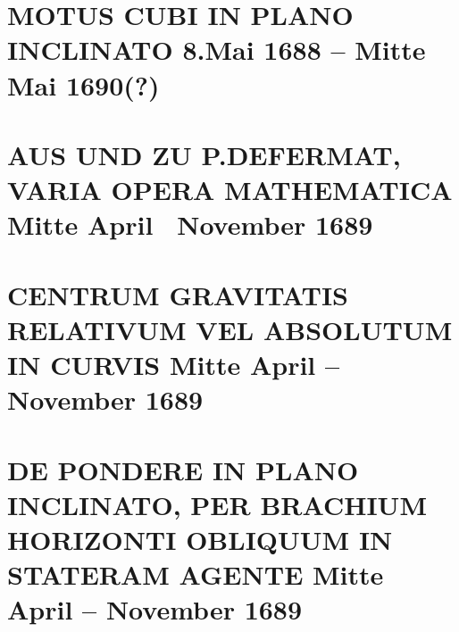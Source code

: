 \documentclass[%
fontsize=10pt,
]{scrbook}
\DeclareRobustCommand{\bracks}[1]{%
\textup{\lbrack}#1\textup{\rbrack}}
\begin{document}
\label{41199}






\chapter[tocentry={Motus cubi in plano inclinato
\enskip\bracks{8.\;Mai 1688 -- Mitte Mai 1690\;(?)}},
head={Motus cubi in plano inclinato}]%
{\MakeUppercase{Motus cubi in plano inclinato}
\newline\bracks{8.\;Mai 1688 -- Mitte Mai 1690\;(?)}}
\label{60118}






\chapter[tocentry={Aus und zu P.\;de\;Fermat, Varia opera mathematica
\enskip \bracks{Mitte April \textendash\ November 1689}},
head={Aus und zu P.\;de\;Fermat, Varia opera mathematica}]%
{\MakeUppercase{Aus und zu P.\;de\;Fermat, Varia opera mathematica}
\newline \bracks{Mitte April \textendash\ November 1689}}%
\label{58229}






\chapter[tocentry={Centrum gravitatis relativum vel absolutum in curvis
\enskip\bracks{%
Mitte April -- November 1689%
}},
head={Centrum gravitatis in curvis}]%
{\MakeUppercase{Centrum gravitatis relativum vel absolutum in curvis} %
\newline\bracks{%
Mitte April -- November 1689%
}%
}
\label{58240}




\chapter[tocentry={De pondere in plano inclinato, per brachium horizonti obliquum in stateram agente
\enskip\bracks{%
Mitte April -- November 1689%
}},
head={De pondere in plano inclinato}]%
{\MakeUppercase{De pondere in plano inclinato, per brachium horizonti obliquum in stateram agente%
}
\newline\bracks{%
Mitte April -- November 1689%
}}
\label{60197}

\end{document}
